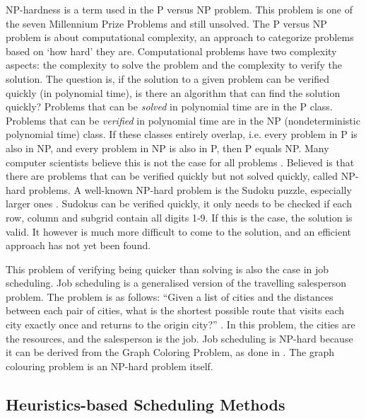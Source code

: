 NP-hardness is a term used in the P versus NP problem. This problem is one of
the seven Millennium Prize Problems \cite{carlson2006} and still unsolved. The
P versus NP problem is about computational complexity, an approach to
categorize problems based on `how hard' they are. Computational problems
have two complexity aspects: the complexity to solve the problem and the
complexity to verify the solution. The question is, if the solution to a given
problem can be verified quickly (in polynomial time), is there an algorithm
that can find the solution quickly? Problems that can be \emph{solved} in
polynomial time are in the P class. Problems that can be \emph{verified} in
polynomial time are in the NP (nondeterministic polynomial time) class. If
these classes entirely overlap, i.e. every problem in P is also in NP, and
every problem in NP is also in P, then P equals NP. Many computer scientists
believe this is not the case for all problems \cite{rosenberger2012}. Believed
is that there are problems that can be verified quickly but not solved
quickly, called NP-hard problems. A well-known NP-hard problem is the Sudoku
puzzle, especially larger ones \cite{yato2003}. Sudokus can be verified
quickly, it only needs to be checked if each row, column and subgrid
contain all digits 1-9. If this is the case, the solution is valid. It however
is much more difficult to come to the solution, and an efficient approach has
not yet been found.

This problem of verifying being quicker than solving is also the case in job
scheduling. Job scheduling is a generalised version of the travelling
salesperson problem. The problem is as follows: ``Given a list of cities and
the distances between each pair of cities, what is the shortest possible route
that visits each city exactly once and returns to the origin city?''
\cite{flood1956}. In this problem, the cities are the resources, and the
salesperson is the job. Job scheduling is NP-hard because it can be derived from
the Graph Coloring Problem, as done in . The graph colouring
problem is an NP-hard problem itself.


\subsection{Heuristics-based Scheduling Methods}\label{sec:situ}

